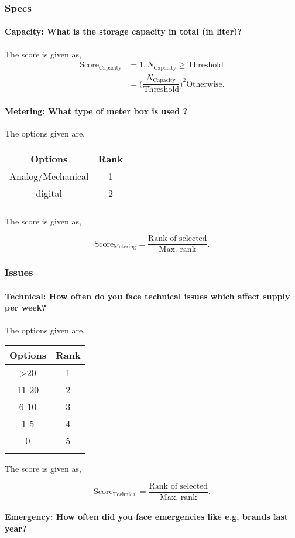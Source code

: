 \documentclass[oneside,twocolumn]{article}
\newcommand{\tsub}[2]{\text{#1}_{\text{#2}}}
\newcommand{\tsubb}[2]{#1_{\text{#2}}}
\newcommand{\dsub}[2]{\dfrac{\text{#1}}{\text{#2}}}
\newcommand{\singsel}[1]
{
	\[
		\tsub{Score}{#1} = \dsub{Rank of selected}{Max. rank}.
	\]
}
\newenvironment{ttable}
{
\begin{center}
\begin{tabular}{c|c}
\hline
}
{
\\ \hline
\end{tabular}
\end{center}
}
\begin{document}
\subsubsection{Specs}

\paragraph{Capacity: What is the storage capacity in total (in liter)?}

The score is given as,
\begin{align*}
\tsub{Score}{Capacity} &= 1, \tsubb{N}{Capacity} \ge \text{Threshold} \\
        &=
\Big(\dfrac{\tsubb{N}{Capacity}}{\text{Threshold}}\Big)^{2}
\text{Otherwise}.
\end{align*}
\paragraph{Metering: What type of meter box is used ?}

The options given are,
\begin{ttable}
Options & Rank \\ \hline
Analog/Mechanical & 1 \\
digital & 2 \\
\hline
\end{ttable}
The score is given as,
\singsel{Metering}
\subsubsection{Issues}

\paragraph{Technical: How often do you face technical issues which affect supply per week?}

The options given are,
\begin{ttable}
Options & Rank \\ \hline
\textgreater20 & 1 \\
11-20 & 2 \\
6-10 & 3 \\
1-5 & 4 \\
0 & 5 \\
\hline
\end{ttable}
The score is given as,
\singsel{Technical}
\paragraph{Emergency: How often did you face emergencies like e.g. brands last year?}
\end{document}
